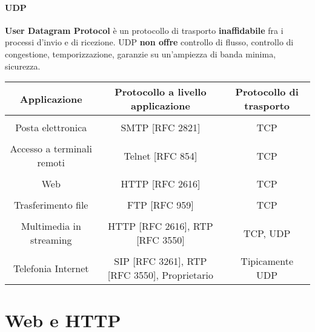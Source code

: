             \paragraph{UDP} \textbf{User Datagram Protocol} è un protocollo di trasporto \textbf{inaffidabile} fra i processi d'invio e di ricezione. UDP \textbf{non offre} controllo di flusso, controllo di congestione, temporizzazione, garanzie su un'ampiezza di banda minima, sicurezza.
            
            \begin{table}[H]
                \centering
                \begin{adjustbox}{max width=\textwidth}
                    \begin{tabular}{c c c}
                        \textbf{Applicazione} & \textbf{Protocollo a livello applicazione} & \textbf{Protocollo di trasporto} \\
                        \hline \\
                        Posta elettronica & SMTP [RFC 2821] & TCP \\
                        \hline \\
                        Accesso a terminali remoti & Telnet [RFC 854] & TCP \\
                        \hline \\
                        Web & HTTP [RFC 2616] & TCP \\
                        \hline \\
                        Trasferimento file & FTP [RFC 959] & TCP \\
                        \hline \\
                        Multimedia in streaming & HTTP [RFC 2616], RTP [RFC 3550] & TCP, UDP \\
                        \hline \\
                        Telefonia Internet & SIP [RFC 3261], RTP [RFC 3550], Proprietario & Tipicamente UDP \\  
                        \hline
                    \end{tabular}
                \end{adjustbox}
            \end{table}
\section{Web e HTTP}
